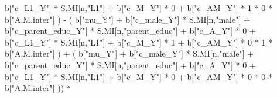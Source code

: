\documentclass[
]{book}
\newenvironment{Shaded}{\begin{snugshade}}{\end{snugshade}}
\newcommand{\DecValTok}[1]{\textcolor[rgb]{0.00,0.00,0.81}{#1}}
\newcommand{\NormalTok}[1]{#1}
\newcommand{\SpecialCharTok}[1]{\textcolor[rgb]{0.00,0.00,0.00}{#1}}
\newcommand{\StringTok}[1]{\textcolor[rgb]{0.31,0.60,0.02}{#1}}
\begin{document}
\begin{Shaded}
\begin{Highlighting}[]
\NormalTok{                                b[}\StringTok{"c\_L1\_Y"}\NormalTok{] }\SpecialCharTok{*}\NormalTok{ S.MI[n,}\StringTok{"L1"}\NormalTok{] }\SpecialCharTok{+}
\NormalTok{                                b[}\StringTok{"c\_M\_Y"}\NormalTok{] }\SpecialCharTok{*} \DecValTok{0} \SpecialCharTok{+}
\NormalTok{                                b[}\StringTok{"c\_AM\_Y"}\NormalTok{] }\SpecialCharTok{*} \DecValTok{1} \SpecialCharTok{*} \DecValTok{0} \SpecialCharTok{*}\NormalTok{ b[}\StringTok{"A.M.inter"}\NormalTok{] ) }\SpecialCharTok{{-}} 
\NormalTok{                            ( b[}\StringTok{"mu\_Y"}\NormalTok{] }\SpecialCharTok{+} 
\NormalTok{                                b[}\StringTok{"c\_male\_Y"}\NormalTok{] }\SpecialCharTok{*}\NormalTok{ S.MI[n,}\StringTok{"male"}\NormalTok{] }\SpecialCharTok{+} 
\NormalTok{                                b[}\StringTok{"c\_parent\_educ\_Y"}\NormalTok{] }\SpecialCharTok{*}\NormalTok{ S.MI[n,}\StringTok{"parent\_educ"}\NormalTok{] }\SpecialCharTok{+} 
\NormalTok{                                b[}\StringTok{"c\_A\_Y"}\NormalTok{] }\SpecialCharTok{*} \DecValTok{0} \SpecialCharTok{+} 
\NormalTok{                                b[}\StringTok{"c\_L1\_Y"}\NormalTok{] }\SpecialCharTok{*}\NormalTok{ S.MI[n,}\StringTok{"L1"}\NormalTok{] }\SpecialCharTok{+}
\NormalTok{                                b[}\StringTok{"c\_M\_Y"}\NormalTok{] }\SpecialCharTok{*} \DecValTok{1} \SpecialCharTok{+}
\NormalTok{                                b[}\StringTok{"c\_AM\_Y"}\NormalTok{] }\SpecialCharTok{*} \DecValTok{0} \SpecialCharTok{*} \DecValTok{1} \SpecialCharTok{*}\NormalTok{ b[}\StringTok{"A.M.inter"}\NormalTok{] ) }\SpecialCharTok{+} 
\NormalTok{                            ( b[}\StringTok{"mu\_Y"}\NormalTok{] }\SpecialCharTok{+} 
\NormalTok{                                b[}\StringTok{"c\_male\_Y"}\NormalTok{] }\SpecialCharTok{*}\NormalTok{ S.MI[n,}\StringTok{"male"}\NormalTok{] }\SpecialCharTok{+} 
\NormalTok{                                b[}\StringTok{"c\_parent\_educ\_Y"}\NormalTok{] }\SpecialCharTok{*}\NormalTok{ S.MI[n,}\StringTok{"parent\_educ"}\NormalTok{] }\SpecialCharTok{+} 
\NormalTok{                                b[}\StringTok{"c\_A\_Y"}\NormalTok{] }\SpecialCharTok{*} \DecValTok{0} \SpecialCharTok{+} 
\NormalTok{                                b[}\StringTok{"c\_L1\_Y"}\NormalTok{] }\SpecialCharTok{*}\NormalTok{ S.MI[n,}\StringTok{"L1"}\NormalTok{] }\SpecialCharTok{+}
\NormalTok{                                b[}\StringTok{"c\_M\_Y"}\NormalTok{] }\SpecialCharTok{*} \DecValTok{0} \SpecialCharTok{+}
\NormalTok{                                b[}\StringTok{"c\_AM\_Y"}\NormalTok{] }\SpecialCharTok{*} \DecValTok{0} \SpecialCharTok{*} \DecValTok{0} \SpecialCharTok{*}\NormalTok{ b[}\StringTok{"A.M.inter"}\NormalTok{] )) }\SpecialCharTok{*}

\end{Highlighting}
\end{Shaded}
\end{document}
